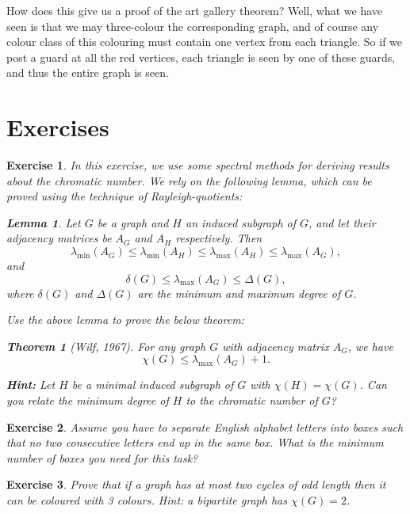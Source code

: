 \documentclass[nobib]{tufte-handout}
\newtheorem{lemma}{Lemma}
\newtheorem{theorem}{Theorem}
\newtheorem{xca}{Exercise}
\begin{document}
How does this give us a proof of the art gallery theorem? Well, what we have seen is that we may three-colour the corresponding graph, and of course any colour class of this colouring must contain one vertex from each triangle. So if we post a guard at all the red vertices, each triangle is seen by one of these guards, and thus the entire graph is seen.

\section{Exercises}

\begin{xca}
  In this exercise, we use some \emph{spectral} methods for deriving results about the chromatic number. We rely on the following lemma, which can be proved using the technique of Rayleigh-quotients:

  \begin{lemma}
    Let $G$ be a graph and $H$ an induced subgraph of $G$, and let their adjacency matrices be $A_G$ and $A_H$ respectively. Then
    $$\lambda_{\min}\left(A_G\right) \leq \lambda_{\min}\left(A_H\right) \leq \lambda_{\max}\left(A_H\right) \leq \lambda_{\max}\left(A_G\right),$$
    and
    $$\delta(G) \leq \lambda_{\max}\left(A_G\right) \leq \Delta(G),$$
    where $\delta(G)$ and $\Delta(G)$ are the minimum and maximum degree of $G$.
  \end{lemma}

  Use the above lemma to prove the below theorem:
  \begin{theorem}[Wilf, 1967]
    For any graph $G$ with adjacency matrix $A_G$, we have
    $$\chi(G) \leq \lambda_{\max}\left(A_G\right) + 1.$$
  \end{theorem}

  \textbf{Hint:} Let $H$ be a minimal induced subgraph of $G$ with $\chi(H) = \chi(G)$. Can you relate the minimum degree of $H$ to the chromatic number of $G$?
\end{xca}

\begin{xca}
Assume you have to separate English alphabet letters into boxes such that no two consecutive letters end up in the same box. What is the minimum number of boxes you need for this task?
\end{xca}

\begin{xca}
Prove that if a graph has at most two cycles of odd length then it can be
coloured with 3 colours. \textit{Hint}: a bipartite graph has $\chi(G) = 2$.
\end{xca}


%
%
\end{document}
